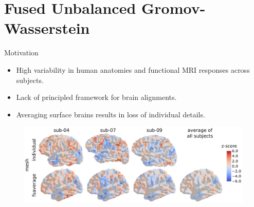 \documentclass{beamer}
\begin{document}
\section{Fused Unbalanced Gromov-Wasserstein}

\begin{frame}{Motivation}
\scriptsize
\begin{itemize}
  \item High variability in human anatomies and functional MRI responses across subjects.
  \item Lack of principled framework for brain alignments.
  \item Averaging surface brains results in loss of individual details.
\end{itemize}
\begin{figure}
  \centering
  \includegraphics[width=1.\linewidth, keepaspectratio=true]{OT_new/intro_variation.pdf}
\end{figure}


\end{frame}
\end{document}
